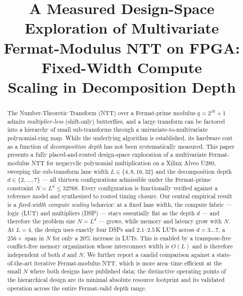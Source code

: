 \documentclass[conference]{IEEEtran}
\begin{document}
\title{A Measured Design-Space Exploration of Multivariate\\
Fermat-Modulus NTT on FPGA: Fixed-Width Compute\\
Scaling in Decomposition Depth}

\author{
}

\maketitle

\begin{abstract}
The Number-Theoretic Transform (NTT) over a Fermat-prime modulus
$q=2^{16}+1$ admits \emph{multiplier-less} (shift-only) butterflies, and a large
transform can be factored into a hierarchy of small sub-transforms through a
univariate-to-multivariate polynomial-ring map. While the underlying algorithm
is established, its hardware cost as a function of \emph{decomposition depth} has
not been systematically measured. This paper presents a fully placed-and-routed
design-space exploration of a multivariate Fermat-modulus NTT for negacyclic
polynomial multiplication on a Xilinx Alveo U280, sweeping the sub-transform
lane width $L\in\{4,8,16,32\}$ and the decomposition depth $d\in\{2,\dots,7\}$ ---
all thirteen configurations admissible under the Fermat-prime constraint
$N=L^{d}\le 32768$. Every configuration is functionally verified against a
reference model and synthesized to routed timing closure. Our central empirical
result is a \emph{fixed-width compute scaling} behavior: at a fixed lane width,
the compute fabric --- logic (LUT) and multipliers (DSP) --- stays essentially
flat as the depth $d$ --- and therefore the problem size $N=L^{d}$ --- grows,
while memory and latency grow with $N$. At $L=4$, the design uses exactly four
DSPs and $2.1$--$2.5$\,K LUTs across $d=3\ldots7$, a $256\times$ span in $N$
for only a $20\%$ increase in LUTs. This is enabled by a transpose-free
conflict-free memory organization whose interconnect width is $O(L)$ and is
therefore independent of both $d$ and $N$. We further report a candid comparison
against a state-of-the-art iterative Fermat-modulus NTT, which is more
area--time efficient at the small $N$ where both designs have published data; the
distinctive operating points of the hierarchical design are its minimal absolute
resource footprint and its validated operation across the entire Fermat-valid
depth range.
\end{abstract}
\end{document}
